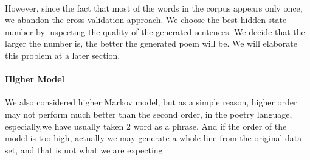 \paragraph{}
However, since the fact that most of the words in the corpus appears only once, we abandon the cross validation approach. We choose the best hidden state number by inspecting the quality of the generated sentences. We decide that the larger the number is, the better the generated poem will be. We will elaborate this problem at a later section. 
\paragraph{Higher Model}
We also considered higher Markov model, but as a simple reason, higher order may not perform much better than the second order, in the poetry language, especially,we have usually taken 2 word as a phrase. And if the order of the model is too high, actually we may generate a whole line from the original data set, and that is not what we are expecting. 

